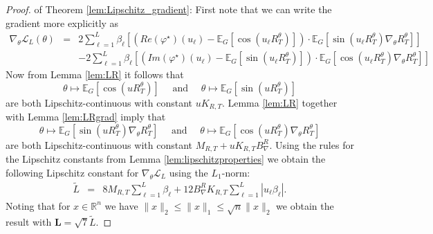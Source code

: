 \documentclass[reqno, 11pt]{amsart}%
\newcommand\EE{\mathbb E}
\newcommand\RR{\mathbb R}
\theoremstyle{definition}
\begin{document}
\begin{proof} of Theorem \ref{lem:Lipschitz_gradient}:
First note that we can write the gradient more explicitly as
\begin{eqnarray*}
     \nabla_\theta \mathcal{L}_L(\theta) &=&
   2 \sum_{\ell=1}^L \beta_\ell  \left[ \left(Re(\varphi^\star)(u_\ell)-\EE_G[\cos(u_\ell R_T^\theta)]\right)\cdot \mathbb{E}_G\left[ \sin(u_\ell R_T^\theta) \nabla_\theta R_T^\theta \right] \right] \\
   && - 2 \sum_{\ell=1}^L  \beta_\ell \left[ \left(Im(\varphi^\star)(u_\ell)-\EE_G[\sin(u_\ell R_T^\theta)]\right)\cdot \mathbb{E}_G\left[ \cos(u_\ell R_T^\theta) \nabla_\theta R_T^\theta \right] \right] 
\end{eqnarray*}
Now from Lemma \ref{lem:LR} it follows that
$$\theta \mapsto \EE_G[\cos(u R_T^\theta)] \quad\mbox{   and    } \quad\theta \mapsto \EE_G[\sin(u R_T^\theta)]$$
are both Lipschitz-continuous with constant $u K_{R,T}.$
Lemma \ref{lem:LR} together with Lemma \ref{lem:LRgrad} imply that 
$$\theta \mapsto \EE_G[\sin(u R_T^\theta) \nabla_\theta R_T^\theta ] \quad \mbox{   and    }\quad \theta \mapsto \EE_G[\cos(u R_T^\theta) \nabla_\theta R_T^\theta]$$
are both Lipschitz-continuous with constant $M_{R,T} + u K_{R,T} B_\nabla^R.$ Using the rules for the Lipschitz constants from Lemma \ref{lem:lipschitzproperties} we obtain 
the following Lipschitz constant for $ \nabla_\theta \mathcal{L}_L$ using the $L_1$-norm:
\begin{eqnarray*}
    \tilde L &=& 8 M_{R,T} \sum_{\ell=1}^L \beta_\ell  + 12 B_\nabla^R K_{R,T} \sum_{\ell=1}^L |u_\ell\beta_\ell|.
\end{eqnarray*}
Noting that for $x\in\RR^n$ we have $\|x\|_2 \le \|x\|_1\le \sqrt{n} \|x\|_2$ we obtain 
 the result with $\mathbf{L} =\sqrt{7} \tilde L$.
\end{proof}
\end{document}

